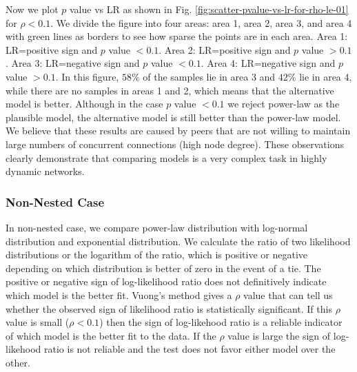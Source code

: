 \documentclass[paper]{ieice}
\begin{document}
Now we plot $p$ value vs LR as shown in Fig. \ref{fig:scatter-pvalue-vs-lr-for-rho-le-01} for $\rho < 0.1$.
We divide the figure into four areas: area 1, area 2, area 3, and area 4  with green lines as borders to see how sparse the points are in each area.
Area 1: LR=positive sign and $p$ value $<0.1$.
Area 2: LR=positive sign and $p$ value $>0.1$.
Area 3: LR=negative sign and $p$ value $<0.1$.
Area 4: LR=negative sign and $p$ value $>0.1$. 
In this figure, $58\%$ of the samples lie in area 3 and  $42\%$ lie in area 4, while there are no samples in areas 1 and 2, which means that the alternative model is better.
Although in the case $p$ value $<0.1$ we reject power-law as the plausible model, the alternative model is still better than the power-law model. 
We believe that these results are caused by peers that are not willing to maintain large numbers of concurrent connections (high node degree).
These observations clearly demonstrate that comparing models is a very complex task in highly dynamic networks.

\subsubsection{Non-Nested Case}
In non-nested case, we compare power-law distribution with log-normal distribution and exponential distribution.
We calculate the ratio of two likelihood distributions or the logarithm of the ratio, which is positive or negative depending on which distribution is better of zero in the event of a tie. 
The positive or negative sign of log-likelihood ratio does not definitively indicate which model is the better fit. 
Vuong's \cite{vuong1989likelihood}  method gives a $\rho$ value that can tell us whether the observed sign of likelihood ratio is statistically significant.
If this $\rho$ value is small ($\rho < 0.1$) then the sign of log-likehood ratio is a reliable indicator of which model is the better fit to the data. 
If the $\rho$ value is large the sign of log-likehood ratio is not reliable and the test does not favor either model over the other. 
\end{document}
